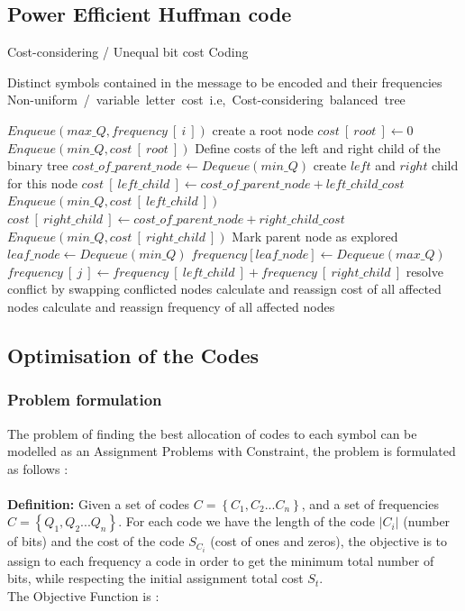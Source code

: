 \documentclass[preprint,12pt]{elsarticle}
\begin{document}
\subsection{Power Efficient Huffman code}
\begin{algorithm}[!btph]
\caption{Cost-considering / Unequal bit cost Coding}
\label{alg1}

\begin{algorithmic}[1]
\REQUIRE Distinct symbols contained in the message to be encoded and their frequencies 
\ENSURE Non-uniform\ /\ variable\ letter\ cost\ i.e,\ Cost-considering\ balanced\ tree

\STATE $ Enqueue\left(max\_Q , frequency~[~i~]\right)$
\ENDFOR
\STATE create a root node
\STATE $cost~[~root~]\leftarrow 0$
\STATE $Enqueue\left(min\_Q , cost~[~root~]\right)$
\STATE Define costs of the left and right child of the binary tree
\REPEAT 
\STATE $cost\_of\_parent\_node\leftarrow Dequeue\left(min\_Q\right)$
\STATE create $left$ and $right$ child for this node
\STATE $cost~[~left\_child~]\leftarrow cost\_of\_parent\_node+left\_child\_cost$
\STATE $Enqueue\left(min\_Q , cost~[~left\_child~]\right)$
\STATE $cost~[~right\_child~]\leftarrow cost\_of\_parent\_node+right\_child\_cost$
\STATE $Enqueue\left(min\_Q , cost~[~right\_child~]\right)$
\STATE Mark parent node as explored
\STATE $leaf\_node\leftarrow Dequeue\left(min\_Q\right)$
\STATE $frequency[leaf\_node]\leftarrow Dequeue\left(max\_Q\right)$
\ENDWHILE
{} 
\STATE $frequency~[~j~]\leftarrow frequency~[~left\_child~]+frequency~[~right\_child~]$
\ENDFOR
\REPEAT
{} 
\STATE resolve conflict by swapping conflicted nodes
\STATE calculate and reassign cost of all affected nodes
\STATE calculate and reassign frequency of all affected nodes 
\ENDIF
{}
\end{algorithmic}
\end{algorithm}
\subsection{Optimisation of the Codes}
\subsubsection{Problem formulation}
The problem of finding the best allocation of codes to each symbol can be   modelled as an Assignment Problems with Constraint, the problem is formulated as follows :\\\\
\textbf{Definition:} Given a set of codes $C=\left\{C_{1},C_{2}...C_{n}\right\}$, and a set of frequencies $C=\left\{Q_{1},Q_{2}...Q_{n}\right\}$. For each code we have the length of the code $|C_{i}|$ (number of bits) and the cost of the code $S_{C_{i}}$ (cost of ones and zeros), the objective is to assign to each frequency a code in order to get the minimum total number of bits, while respecting the initial assignment total cost $S_{t}$.   
\\
The Objective Function is : 
\end{document}

